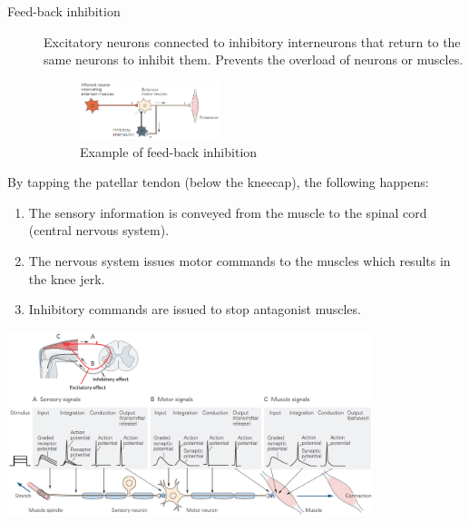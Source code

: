 \begin{description}
\begin{description}
\begin{description}
                    \item[Feed-back inhibition] 
                        Excitatory neurons connected to inhibitory interneurons that return to the same neurons to inhibit them.
                        Prevents the overload of neurons or muscles.
                        \begin{figure}[H]
                            \centering
                            \includegraphics[width=0.4\textwidth]{./img/feedback_inhibition.png}
                            \caption{Example of feed-back inhibition}
                        \end{figure}
                \end{description}
        \end{description}
\end{description}



\begin{example}
    By tapping the patellar tendon (below the kneecap), the following happens:
    \begin{enumerate}
        \item The sensory information is conveyed from the muscle to the spinal cord (central nervous system).
        \item The nervous system issues motor commands to the muscles which results in the knee jerk.
        \item Inhibitory commands are issued to stop antagonist muscles.
    \end{enumerate}

    \begin{center}
        \includegraphics[width=0.8\textwidth]{./img/knee_jerk.png}
    \end{center}
\end{example}


